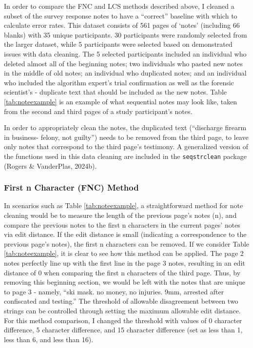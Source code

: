 \documentclass[print]{nuthesis}
\begin{document}
In order to compare the FNC and LCS methods described above, I cleaned a subset of the survey response notes to have a ``correct'' baseline with which to calculate error rates.
This dataset consists of 561 pages of `notes' (including 66 blanks) with 35 unique participants.
30 participants were randomly selected from the larger dataset, while 5 participants were selected based on demonstrated issues with data cleaning.
The 5 selected participants included an individual who deleted almost all of the beginning notes; two individuals who pasted new notes in the middle of old notes; an individual who duplicated notes; and an individual who included the algorithm expert's trial confirmation as well as the forensic scientist's - duplicate text that should be included as the new notes.
Table \ref{tab:noteexample} is an example of what sequential notes may look like, taken from the second and third pages of a study participant's notes.

In order to appropriately clean the notes, the duplicated text (``discharge firearm in business- felony, not guilty'') needs to be removed from the third page, to leave only notes that correspond to the third page's testimony.
A generalized version of the functions used in this data cleaning are included in the \texttt{seqstrclean} package (Rogers \& VanderPlas, 2024b).

\hypertarget{first-n-character-fnc-method}{%
\subsubsection{First n Character (FNC) Method}\label{first-n-character-fnc-method}}

In scenarios such as Table \ref{tab:noteexample}, a straightforward method for note cleaning would be to measure the length of the previous page's notes (n), and compare the previous notes to the first n characters in the current pages' notes via edit distance.
If the edit distance is small (indicating a correspondence to the previous page's notes), the first n characters can be removed.
If we consider Table \ref{tab:noteexample}, it is clear to see how this method can be applied.
The page 2 notes perfectly line up with the first line in the page 3 notes, resulting in an edit distance of 0 when comparing the first n characters of the third page.
Thus, by removing this beginning section, we would be left with the notes that are unique to page 3 - namely, ``ski mask. no money, no injuries. 9mm, arrested after confiscated and testing.''
The threshold of allowable disagreement between two strings can be controlled through setting the maximum allowable edit distance.
For this method comparison, I changed the threshold with values of 0 character difference, 5 character difference, and 15 character difference (set as less than 1, less than 6, and less than 16).
\end{document}
